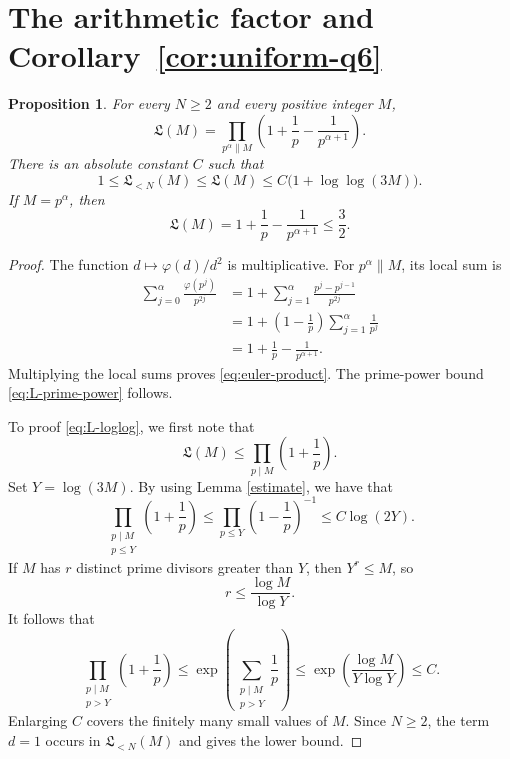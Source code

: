 \documentclass[11pt, twoside]{article}
\numberwithin{equation}{section}
\newtheorem{proposition}[theorem]{Proposition}
\theoremstyle{definition}
\newcommand{\Lcal}{\mathfrak L}
\begin{document}
\section{The arithmetic factor and Corollary~\ref{cor:uniform-q6}}
\label{sec:arithmetic-factor}

\begin{proposition}\label{prop:euler-factor}
For every $N\geq2$ and every positive integer $M$,
\begin{equation}\label{eq:euler-product}
\Lcal(M)
=\prod_{p^\alpha\parallel M}
\left(1+\frac1p-\frac1{p^{\alpha+1}}\right).
\end{equation}
There is an absolute constant $C$ such that
\begin{equation}\label{eq:L-loglog}
1\leq\Lcal_{<N}(M)\leq\Lcal(M)
\leq C\bigl(1+\log\log(3M)\bigr).
\end{equation}
If $M=p^\alpha$, then
\begin{equation}\label{eq:L-prime-power}
\Lcal(M)=1+\frac1p-\frac1{p^{\alpha+1}}\leq\frac32.
\end{equation}
\end{proposition}

\begin{proof}
The function $d\mapsto\varphi(d)/d^2$ is multiplicative.  For
$p^\alpha\parallel M$, its local sum is
$$
\begin{aligned}
\sum_{j=0}^{\alpha}\frac{\varphi(p^j)}{p^{2j}}
&=1+\sum_{j=1}^{\alpha}\frac{p^j-p^{j-1}}{p^{2j}}\\
&=1+\left(1-\frac1p\right)\sum_{j=1}^{\alpha}\frac1{p^j}\\
&=1+\frac1p-\frac1{p^{\alpha+1}}.
\end{aligned}
$$
Multiplying the local sums proves \eqref{eq:euler-product}.
The prime-power bound \eqref{eq:L-prime-power} follows.

To proof \eqref{eq:L-loglog}, we first note that
$$
\Lcal(M)\leq\prod_{p\mid M}\left(1+\frac1p\right).
$$
Set $Y=\log(3M)$.  By using Lemma \ref{estimate}, we have that
$$
\prod_{\substack{p\mid M\\p\leq Y}}
\left(1+\frac1p\right)
\leq
\prod_{p\leq Y}\left(1-\frac1p\right)^{-1}
\leq C\log(2Y).
$$
If $M$ has $r$ distinct prime divisors greater than $Y$, then $Y^r\leq M$,
so
$$
r\leq\frac{\log M}{\log Y}.
$$
It follows that
$$
\prod_{\substack{p\mid M\\p>Y}}
\left(1+\frac1p\right)
\leq
\exp\!\left(\sum_{\substack{p\mid M\\p>Y}}\frac1p\right)
\leq
\exp\!\left(\frac{\log M}{Y\log Y}\right)
\leq C.
$$
Enlarging $C$ covers the finitely many small values of $M$.
Since $N\geq2$, the term $d=1$ occurs in $\Lcal_{<N}(M)$ and gives the lower
bound.
\end{proof}
\end{document}
